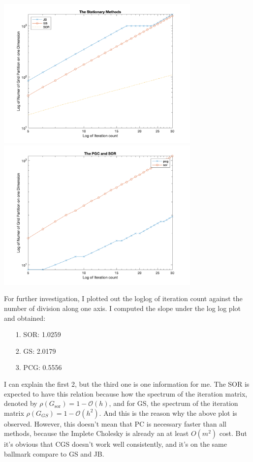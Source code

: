 \documentclass[]{article}
\begin{document}
    \begin{center}
        \includegraphics[width=10cm]{h_vs_stationary_methods.png}
        \includegraphics[width=10cm]{h_vs_pcg_sor.png}    
    \end{center}
    For further investigation, I plotted out the loglog of iteration count against the number of division along one axis. I computed the slope under the log log plot and obtained: 
    \begin{enumerate}
        \item [1.]SOR: 1.0259
        \item [2.]GS: 2.0179
        \item [3.]PCG: 0.5556
    \end{enumerate}
    I can explain the first 2, but the third one is one information for me. The SOR is expected to have this relation because how the spectrum of the iteration matrix, denoted by $\rho(G_{\text{sor}}) = 1 - \mathcal{O}(h)$, and for GS, the spectrum of the iteration matrix $\rho(G_{GS})= 1 -\mathcal{O}(h^2)$. And this is the reason why the above plot is observed. However, this doesn't mean that PC is necessary faster than all methods, because the Implete Cholesky is already an at least $O(m^2)$ cost. But it's obvious that CGS doesn't work well consistently, and it's on the same ballmark compare to GS and JB. 
\end{document}

